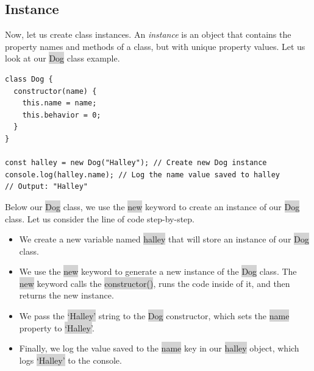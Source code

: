 \documentclass[11pt]{article}
\begin{document}
\subsection{Instance}
Now, let us create class instances. An \textit{instance} is an object that contains the property names and methods of a class, but with unique property values. Let us look at our \colorbox{lightgray}{Dog} class example. 
\begin{lstlisting}
class Dog {
  constructor(name) {
    this.name = name;
    this.behavior = 0;
  } 
}

const halley = new Dog("Halley"); // Create new Dog instance
console.log(halley.name); // Log the name value saved to halley
// Output: "Halley"
\end{lstlisting}
Below our \colorbox{lightgray}{Dog} class, we use the \colorbox{lightgray}{new} keyword to create an instance of our \colorbox{lightgray}{Dog} class. Let us consider the line of code step-by-step.
\begin{itemize}[leftmargin = *]
\item We create a new variable named \colorbox{lightgray}{halley} that will store an instance of our \colorbox{lightgray}{Dog} class.
\item We use the \colorbox{lightgray}{new} keyword to generate a new instance of the \colorbox{lightgray}{Dog} class. The \colorbox{lightgray}{new} keyword calls the \colorbox{lightgray}{constructor()}, runs the code inside of it, and then returns the new instance.
\item We pass the \colorbox{lightgray}{`Halley'} string to the \colorbox{lightgray}{Dog} constructor, which sets the \colorbox{lightgray}{name} property to \colorbox{lightgray}{`Halley'}.
\item Finally, we log the value saved to the \colorbox{lightgray}{name} key in our \colorbox{lightgray}{halley} object, which logs \colorbox{lightgray}{`Halley'} to the console.
\end{itemize}
\end{document}
